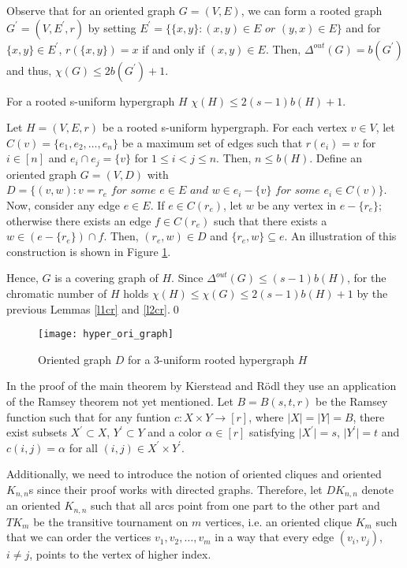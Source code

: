 Observe that for an oriented graph $G=(V,E)$, we can form a rooted graph $G^\prime =(V,E^\prime ,r)$ by setting $E^\prime =\{\{ x,y\} :(x,y)\in E \textit{ or } (y,x)\in E\}$ and for $\{ x,y\}\in E^\prime$, $r(\{ x,y\} )=x$ if and only if $(x,y)\in E$. Then, $\Delta^{out}(G)=b(G^\prime )$ and thus, $\chi (G)\leq 2b(G^\prime ) +1$.

\begin{lemma}\label{l3cr}
For a rooted s-uniform hypergraph $H$ $\chi (H)\leq 2(s-1)b(H) +1$.
\end{lemma}
\begin{prf}
Let $H=(V,E,r)$ be a rooted s-uniform hypergraph. For each vertex $v\in V$, let $C(v)=\{ e_1,e_2,\dots ,e_n\}$ be a maximum set of edges such that $r(e_i)=v$ for $i\in [n]$ and $e_i\cap e_j = \{ v\}$ for $1\leq i<j\leq n$. Then, $n\leq b(H)$. Define an oriented graph $G=(V,D)$ with $D=\{(v,w): v =r_e \textit{ for some } e\in E\textit{ and } w\in e_i -\{v\} \textit{ for some } e_i\in C(v)\}$. Now, consider any edge $e\in E$. If $e\in C(r_e)$, let $w$ be any vertex in $e-\{ r_e\}$; otherwise there exists an edge $f\in C(r_e)$ such that there exists a $w\in (e-\{ r_e\})\cap f$. Then, $(r_e,w)\in D$ and $\{r_e,w\}\subseteq e$. An illustration of this construction is shown in Figure \ref{f3cr}.

Hence, $G$ is a covering graph of $H$. Since $\Delta^{out}(G)\leq (s-1)b(H)$, for the chromatic number of $H$ holds $\chi (H)\leq\chi (G)\leq 2(s-1)b(H) +1$ by the previous Lemmas \ref{l1cr} and \ref{l2cr}.\qed
\end{prf}

\begin{figure}[ht]
\begin{center}
\texttt{[image: hyper\_ori\_graph]}
\end{center}
\caption{Oriented graph $D$ for a $3$-uniform rooted hypergraph $H$}
\label{f3cr}
\end{figure}

In the proof of the main theorem by Kierstead and Rödl they use an application of the Ramsey theorem not yet mentioned. Let $B=B(s,t,r)$ be the Ramsey function such that for any funtion $c:X\times Y\to [r]$, where $\vert X\vert =\vert Y\vert = B$, there exist subsets $X^\prime\subset X$, $Y^\prime\subset Y$ and a color $\alpha\in [r]$ satisfying $\vert X^\prime\vert = s$, $\vert Y^\prime\vert =t$ and $c(i,j) =\alpha$ for all $(i,j)\in X^\prime\times Y^\prime$. 

Additionally, we need to introduce the notion of oriented cliques and oriented $K_{n,n}$s since their proof works with directed graphs. Therefore, let $DK_{n,n}$ denote an oriented $K_{n,n}$ such that all arcs point from one part to the other part and $TK_m$ be the transitive tournament on $m$ vertices, i.e. an oriented clique $K_m$ such that we can order the vertices $v_1, v_2, \dots ,v_m$ in a way that every edge $(v_i,v_j)$, $i\neq j$, points to the vertex of higher index.

